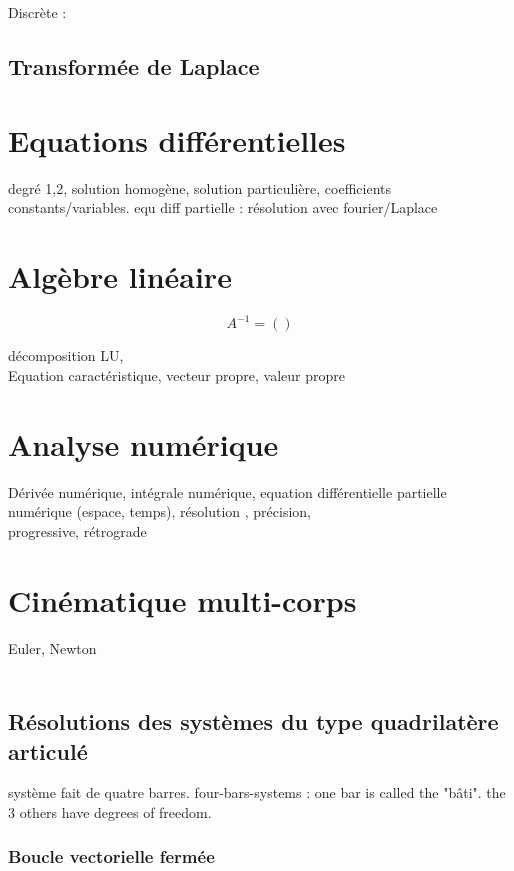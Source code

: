 Discrète : 

\subsection{Transformée de Laplace}

\newpage
\section{Equations différentielles}
degré 1,2, solution homogène, solution particulière,
coefficients constants/variables. 
equ diff partielle : résolution avec fourier/Laplace

\newpage
\section{Algèbre linéaire}
\begin{equation}
A^{-1}=()
\end{equation}

décomposition LU, \\
Equation caractéristique, vecteur propre, valeur propre

\newpage
\section{Analyse numérique}

Dérivée numérique, intégrale numérique, equation différentielle partielle numérique (espace, temps), résolution , précision, \\

progressive, rétrograde

\newpage
\section{Cinématique multi-corps}
Euler, Newton\\
\\
\subsection{Résolutions des systèmes du type quadrilatère articulé}
système fait de quatre barres. 
four-bars-systems : one bar is called the "bâti". the 3 others have degrees of freedom. 

\subsubsection{Boucle vectorielle fermée}

